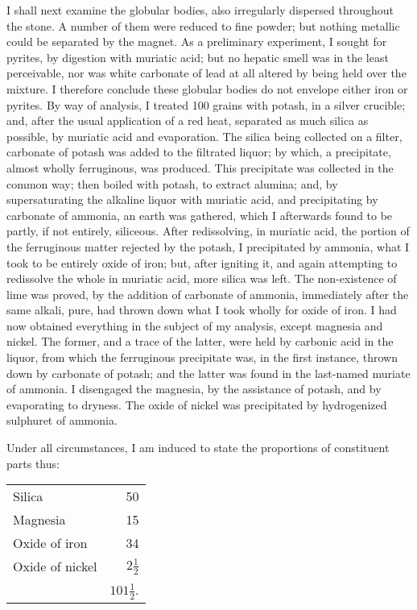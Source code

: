 \documentclass[a4paper, 12pt, oneside]{article}
\begin{document}
I shall next examine the globular bodies, also irregularly dispersed throughout the stone. A number of them were reduced to fine powder; but nothing metallic could be separated by the magnet. As a preliminary experiment, I sought for pyrites, by digestion with muriatic acid; but no hepatic smell was in the least perceivable, nor was white carbonate of lead at all altered by being held over the mixture. I therefore conclude these globular bodies do not envelope either iron or pyrites. By way of analysis, I treated 100 grains with potash, in a silver crucible; and, after the usual application of a red heat, separated as much silica as possible, by muriatic acid and evaporation. The silica being collected on a filter, carbonate of potash was added to the filtrated liquor; by which, a precipitate, almost wholly ferruginous, was produced. This precipitate was collected in the common way; then boiled with potash, to extract alumina; and, by supersaturating the alkaline liquor with muriatic acid, and precipitating by carbonate of ammonia, an earth was gathered, which I afterwards found to be partly, if not entirely, siliceous. After redissolving, in muriatic acid, the portion of the ferruginous matter rejected by the potash, I precipitated by ammonia, what I took to be entirely oxide of iron; but, after igniting it, and again attempting to redissolve the whole in muriatic acid, more silica was left. The non-existence of lime was proved, by the addition of carbonate of ammonia, immediately after the same alkali, pure, had thrown down what I took wholly for oxide of iron. I had now obtained everything in the subject of my analysis, except magnesia and nickel. The former, and a trace of the latter, were held by carbonic acid in the liquor, from which the ferruginous precipitate was, in the first instance, thrown down by carbonate of potash; and the latter was found in the last-named muriate of ammonia. I disengaged the magnesia, by the assistance of potash, and by evaporating to dryness. The oxide of nickel was precipitated by hydrogenized sulphuret of ammonia.

Under all circumstances, I am induced to state the proportions of constituent parts thus:
\begin{table}[H]
    \centering
    \begin{tabular}{l r}
        Silica & 50 \\ 
        Magnesia & 15 \\ 
        Oxide of iron & 34 \\ 
        Oxide of nickel & $2\frac{1}{2}$   \\ \hline
        ~ & $101\frac{1}{2}$. \\
    \end{tabular}
\end{table}
\end{document}
